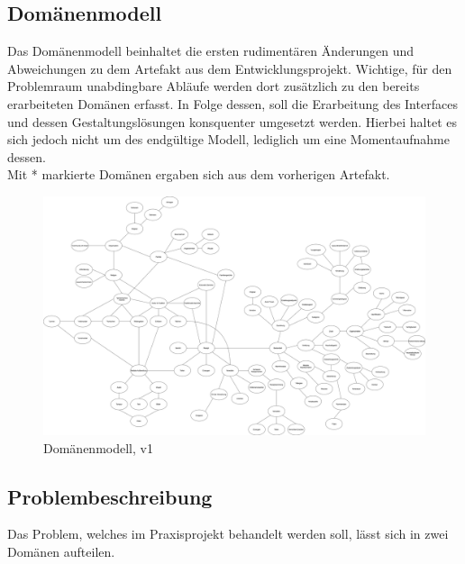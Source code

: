 \documentclass[10pt]{article}
\begin{document}
        \subsection{Domänenmodell}\label{sec:Domaenenmodell}
        Das Domänenmodell beinhaltet die ersten rudimentären Änderungen und Abweichungen zu dem Artefakt aus dem Entwicklungsprojekt. Wichtige, für den Problemraum unabdingbare Abläufe werden dort zusätzlich zu den bereits erarbeiteten Domänen erfasst. In Folge dessen, soll die Erarbeitung des Interfaces und dessen Gestaltungslösungen konsquenter umgesetzt werden. Hierbei haltet es sich jedoch nicht um des endgültige Modell, lediglich um eine Momentaufnahme dessen. \\
        Mit * markierte Domänen ergaben sich aus dem vorherigen Artefakt.\cite{cobanmai2021}
        \begin{figure}[h] %
            \includegraphics[width=1\textwidth]{../Artefakte/Domänenmodell/PPSS21_Mai_Domänenmodell.png}
            \caption[Das Domänenmodell]{Domänenmodell, v1}
            \label{fig:domaenenmodell}
        \end{figure}

        \subsection{Problembeschreibung}\label{sec:Problembeschreibung}
        Das Problem, welches im Praxisprojekt behandelt werden soll, lässt sich in zwei Domänen aufteilen.
\end{document}
